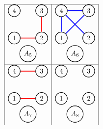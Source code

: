 \[
    \begin{array}{|l|l|}
    \hline

\begin{tikzpicture}
[scale=.2]
\begin{scope}[every node/.style={circle,thick,draw}]
    \node (1) at (0,4) {1};
    \node (2) at (7,4) {2};
    \node (3) at (7,11) {3};
    \node (4) at (0,11) {4};
   \node(A) at (3.5,0) {$A_5$};
\end{scope}

\begin{scope}[%
              every node/.style={fill=white,circle},
              every edge/.style={draw=red,very thick}]
\draw (1) edge  (2);
     \draw (2) edge  (3);
\end{scope}
\end{tikzpicture}
&
\begin{tikzpicture}
[scale=.2]
\begin{scope}[every node/.style={circle,thick,draw}]
    \node (1) at (0,4) {1};
    \node (2) at (7,4) {2};
    \node (3) at (7,11) {3};
    \node (4) at (0,11) {4};
   \node(A) at (3.5,0) {$A_6$};
\end{scope}

\begin{scope}[%
              every node/.style={fill=white,circle},
              every edge/.style={draw=blue,very thick}]
     \draw (3) edge  (4);
     \draw (4) edge  (1);
     \draw (4) edge  (2);
     \draw (3) edge  (1);
             
\end{scope}
\end{tikzpicture}
\\
\hline
\begin{tikzpicture}
[scale=.2]
\begin{scope}[every node/.style={circle,thick,draw}]
    \node (1) at (0,4) {1};
    \node (2) at (7,4) {2};
    \node (3) at (7,11) {3};
    \node (4) at (0,11) {4};
   \node(A) at (3.5,0) {$A_7$};
\end{scope}

\begin{scope}[%
              every node/.style={fill=white,circle},
              every edge/.style={draw=red,very thick}]
\draw (1) edge  (2);
     \draw (3) edge  (4);
\end{scope}
\end{tikzpicture}
&
\begin{tikzpicture}
[scale=.2]
\begin{scope}[every node/.style={circle,thick,draw}]
    \node (1) at (0,4) {1};
    \node (2) at (7,4) {2};
    \node (3) at (7,11) {3};
    \node (4) at (0,11) {4};
   \node(A) at (3.5,0) {$A_8$};
\end{scope}


\end{tikzpicture}
\end{array}\]
